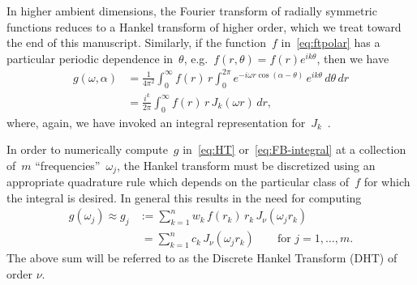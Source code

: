 In higher ambient dimensions, the Fourier transform of radially symmetric
functions reduces to a Hankel transform of higher order, which we treat toward
the end of this manuscript. Similarly, if the function~$f$ in~\eqref{eq:ftpolar}
has a particular periodic dependence in~$\theta$, e.g.~$f(r,\theta) =
f(r)e^{ik\theta}$, then we have
\begin{equation} \label{eq:FB-integral}
  \begin{aligned}
  g(\omega,\alpha) &= \frac{1}{4\pi^2} \int_0^\infty f(r) \, r \int_0^{2\pi} 
  e^{-i \omega r \cos(\alpha - \theta) } \, e^{ik\theta}  \, d\theta \, dr \\
  &= \frac{i^k}{2\pi} \int_0^\infty f(r) \, r \, J_k(\omega r)  \, dr,
  \end{aligned}
\end{equation}
where, again, we have invoked an integral representation
for~$J_k$~\cite{olver2010nist}. 

In order to numerically compute~$g$ in~\eqref{eq:HT} or~\eqref{eq:FB-integral}
at a collection of~$m$ ``frequencies''~$\omega_j$, the Hankel transform must be
discretized using an appropriate quadrature rule which depends on the particular
class of~$f$ for which the integral is desired. In general this results in the
need for computing
\begin{equation} \label{eq:DHT}
  \begin{aligned}
  g(\omega_j) \approx 
  g_j &:= \sum_{k=1}^n w_k \, f(r_k) \, r_k \, J_\nu(\omega_j r_k) \\
  &\ = \sum_{k=1}^n c_k \, J_\nu(\omega_j r_k)
   \qquad \text{for } j = 1, \ldots, m.
  \end{aligned}
\end{equation}
The above sum will be referred to as the Discrete Hankel Transform (DHT) of
order $\nu$. 

